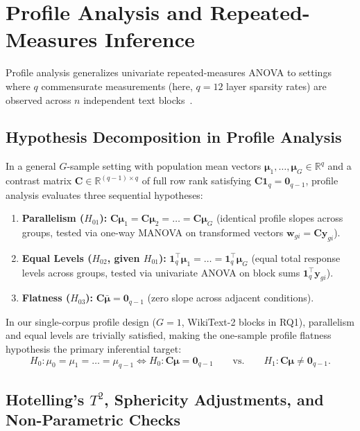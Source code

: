 \documentclass[12pt, a4paper, oneside]{report}
\theoremstyle{definition}
\newcommand{\vect}[1]{\mathbf{#1}}
\newcommand{\mat}[1]{\mathbf{#1}}
\newcommand{\R}{\mathbb{R}}
\begin{document}
\section{Profile Analysis and Repeated-Measures Inference}

Profile analysis generalizes univariate repeated-measures ANOVA to settings where $q$ commensurate measurements (here, $q = 12$ layer sparsity rates) are observed across $n$ independent text blocks~\cite{johnson2014applied, anderson2003introduction}.

\subsection{Hypothesis Decomposition in Profile Analysis}

In a general $G$-sample setting with population mean vectors $\boldsymbol{\mu}_1, \dots, \boldsymbol{\mu}_G \in \R^q$ and a contrast matrix $\mat{C} \in \R^{(q-1) \times q}$ of full row rank satisfying $\mat{C}\vect{1}_q = \vect{0}_{q-1}$, profile analysis evaluates three sequential hypotheses:
\begin{enumerate}
    \item \textbf{Parallelism ($H_{01}$):} $\mat{C}\boldsymbol{\mu}_1 = \mat{C}\boldsymbol{\mu}_2 = \dots = \mat{C}\boldsymbol{\mu}_G$ (identical profile slopes across groups, tested via one-way MANOVA on transformed vectors $\vect{w}_{gi} = \mat{C}\vect{y}_{gi}$).
    \item \textbf{Equal Levels ($H_{02}$, given $H_{01}$):} $\vect{1}_q^\top \boldsymbol{\mu}_1 = \dots = \vect{1}_q^\top \boldsymbol{\mu}_G$ (equal total response levels across groups, tested via univariate ANOVA on block sums $\vect{1}_q^\top \vect{y}_{gi}$).
    \item \textbf{Flatness ($H_{03}$):} $\mat{C}\bar{\boldsymbol{\mu}} = \vect{0}_{q-1}$ (zero slope across adjacent conditions).
\end{enumerate}
In our single-corpus profile design ($G = 1$, WikiText-2 blocks in RQ1), parallelism and equal levels are trivially satisfied, making the one-sample profile flatness hypothesis the primary inferential target:
\begin{equation}
    H_0 : \mu_0 = \mu_1 = \dots = \mu_{q-1} \iff H_0 : \mat{C}\boldsymbol{\mu} = \vect{0}_{q-1}
    \qquad \text{vs.} \qquad
    H_1 : \mat{C}\boldsymbol{\mu} \neq \vect{0}_{q-1}.
    \label{eq:rq1_flatness_hyp}
\end{equation}

\subsection{Hotelling's \texorpdfstring{$T^2$}{T2}, Sphericity Adjustments, and Non-Parametric Checks}
\end{document}
